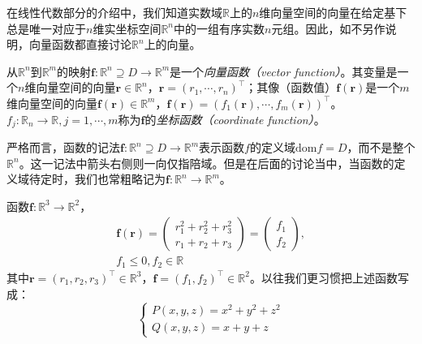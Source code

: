 \documentclass[main.tex]{subfiles}
\begin{document}
在线性代数部分的介绍中，我们知道实数域$\mathbb{R}$上的$n$维向量空间的向量在给定基下总是唯一对应于$n$维实坐标空间$\mathbb{R}^n$中的一组有序实数$n$元组。因此，如不另作说明，向量函数都直接讨论$\mathbb{R}^n$上的向量。

\begin{definition}[向量函数]\label{def:II.4.1}
    从$\mathbb{R}^n$到$\mathbb{R}^m$的映射$\mathbf{f}:\mathbb{R}^n\supseteq D\rightarrow\mathbb{R}^m$是一个\emph{向量函数（vector function）}。其变量是一个$n$维向量空间的向量$\mathbf{r}\in\mathbb{R}^n$，$\mathbf{r}=\left(r_1,\cdots,r_n\right)^\intercal$；其像（函数值）$\mathbf{f}\left(\mathbf{r}\right)$是一个$m$维向量空间的向量$\mathbf{f}\left(\mathbf{r}\right)\in\mathbb{R}^m$，$\mathbf{f}\left(\mathbf{r}\right)=\left(f_1\left(\mathbf{r}\right),\cdots,f_m\left(\mathbf{r}\right)\right)^\intercal$。$f_j:\mathbb{R}_n\rightarrow\mathbb{R},j=1,\cdots,m$称为$\mathbf{f}$的\emph{坐标函数（coordinate function）}。
\end{definition}

严格而言，函数的记法$\mathbf{f}:\mathbb{R}^n\supseteq D\rightarrow\mathbb{R}^m$表示函数$f$的定义域$\mathrm{dom}f=D$，而不是整个$\mathbb{R}^n$。这一记法中箭头右侧则一向仅指陪域。但是在后面的讨论当中，当函数的定义域待定时，我们也常粗略记为$\mathbf{f}:\mathbb{R}^n\rightarrow\mathbb{R}^m$。

\begin{example}\label{exp:II.4.1}
    函数$\mathbf{f}:\mathbb{R}^3\rightarrow\mathbb{R}^2$，
    \[\begin{split}\mathbf{f}\left(\mathbf{r}\right)=\left(\begin{array}{c}r_1^2+r_2^2+r_3^2\\r_1+r_2+r_3\end{array}\right)=\left(\begin{array}{c}f_1\\f_2\end{array}\right),\\f_1\leq0,f_2\in\mathbb{R}\end{split}\]
    其中$\mathbf{r}=\left(r_1,r_2,r_3\right)^\intercal\in\mathbb{R}^3$，$\mathbf{f}=\left(f_1,f_2\right)^\intercal\in\mathbb{R}^2$。以往我们更习惯把上述函数写成：
    \[
        \left\{\begin{array}{l}
            P\left(x,y,z\right)=x^2+y^2+z^2 \\
            Q\left(x,y,z\right)=x+y+z
        \end{array}
        \right.
    \]
\end{example}
\end{document}

